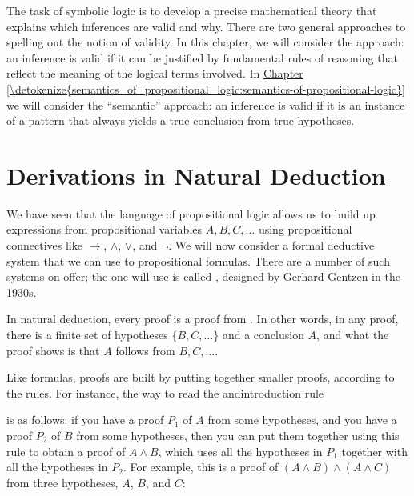 \documentclass[letterpaper,10pt,english]{sphinxmanual}
\begin{document}
\sphinxAtStartPar
The task of symbolic logic is to develop a precise mathematical theory that explains which inferences are valid and why. There are two general approaches to spelling out the notion of validity. In this chapter, we will consider the  approach: an inference is valid if it can be justified by fundamental rules of reasoning that reflect the meaning of the logical terms involved. In \hyperref[\detokenize{semantics_of_propositional_logic:semantics-of-propositional-logic}]{Chapter \ref{\detokenize{semantics_of_propositional_logic:semantics-of-propositional-logic}}} we will consider the “semantic” approach: an inference is valid if it is an instance of a pattern that always yields a true conclusion from true hypotheses.


\section{Derivations in Natural Deduction}
\label{\detokenize{natural_deduction_for_propositional_logic:derivations-in-natural-deduction}}\label{\detokenize{natural_deduction_for_propositional_logic:id1}}
\sphinxAtStartPar
We have seen that the language of propositional logic allows us to build up expressions from propositional variables \(A, B, C, \ldots\) using propositional connectives like \(\to\), \(\wedge\), \(\vee\), and \(\neg\). We will now consider a formal deductive system that we can use to  propositional formulas. There are a number of such systems on offer; the one will use is called , designed by Gerhard Gentzen in the 1930s.

\sphinxAtStartPar
In natural deduction, every proof is a proof from . In other words, in any proof, there is a finite set of hypotheses \(\{ B, C, \ldots \}\) and a conclusion \(A\), and what the proof shows is that \(A\) follows from \(B, C, \ldots\).

\sphinxAtStartPar
Like formulas, proofs are built by putting together smaller proofs, according to the rules. For instance, the way to read the and\sphinxhyphen{}introduction rule



\begin{center}
\DP
\end{center}

\sphinxAtStartPar
is as follows: if you have a proof \(P_1\) of \(A\) from some hypotheses, and you have a proof \(P_2\) of \(B\) from some hypotheses, then you can put them together using this rule to obtain a proof of \(A \wedge B\), which uses all the hypotheses in \(P_1\) together with all the hypotheses in \(P_2\). For example, this is a proof of \((A \wedge B) \wedge (A \wedge C)\) from three hypotheses, \(A\), \(B\), and \(C\):
\end{document}

